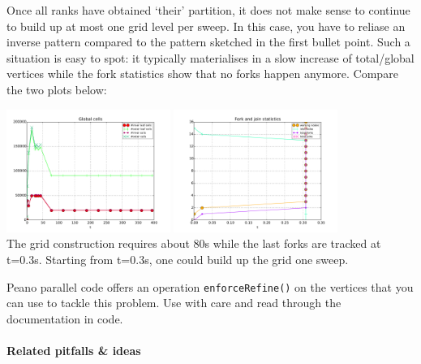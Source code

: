   \item Once all ranks have obtained `their' partition, it does not make sense
  to continue to build up at most one grid level per sweep. In this case, you
  have to reliase an inverse pattern compared to the pattern sketched in the
  first bullet point. Such a situation is easy to spot: it typically
  materialises in a slow increase of total/global vertices while the fork
  statistics show that no forks happen anymore. Compare the two plots below:
  \begin{center}
    \includegraphics[width=0.4\textwidth]{61_mpi-setup/grid-construction.pdf}
    \includegraphics[width=0.4\textwidth]{61_mpi-setup/fork-behaviour.pdf}
    \\
    {
    \footnotesize
    }
  The grid construction requires about 80s while the last forks are tracked
  at t=0.3s. Starting from t=0.3s, one could build up the grid one sweep.
  \end{center}
  \begin{remark}
    Peano parallel code offers an operation \texttt{enforceRefine()} on
    the vertices that you can use to tackle this problem. Use with care and 
    read through the documentation in code.
  \end{remark}


\paragraph{Related pitfalls \& ideas}

